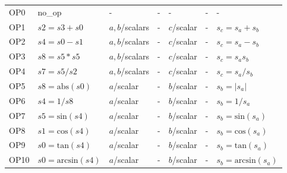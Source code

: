 \documentclass[11pt,oneside,openany,report]{jsbook}
\begin{document}
\begin{center}
{{\begin{longtable}{l|l|lc|lc|l}
        \label{table:instructions}
        OP0  & no\_op                                     & -                       & -               & -          & -     & -                                                                              \\
        OP1  & $s2 = s3 + s0$                             & $a,b$/scalars           & -               & $c$/scalar & -     & $s_c = s_a + s_b$                                                              \\
        OP2  & $s4 = s0 - s1$                             & $a,b$/scalars           & -               & $c$/scalar & -     & $s_c = s_a - s_b$                                                              \\
        OP3  & $s8 = s5 * s5$                             & $a,b$/scalars           & -               & $c$/scalar & -     & $s_c = s_a s_b$                                                                \\
        OP4  & $s7 = s5 / s2$                             & $a,b$/scalars           & -               & $c$/scalar & -     & $s_c = s_a / s_b$                                                              \\
        OP5  & $s8 = \mathrm{abs}(s0)$                    & $a$/scalar              & -               & $b$/scalar & -     & $s_b = |s_a|$                                                                  \\
        OP6  & $s4 = 1/ s8$                               & $a$/scalar              & -               & $b$/scalar & -     & $s_b = 1/s_a$                                                                  \\
        OP7  & $s5 = \mathrm{sin}(s4)$                    & $a$/scalar              & -               & $b$/scalar & -     & $s_b = \mathrm{sin}(s_a)$                                                      \\
        OP8  & $s1 = \mathrm{cos}(s4)$                    & $a$/scalar              & -               & $b$/scalar & -     & $s_b = \mathrm{cos}(s_a)$                                                      \\
        OP9  & $s0 = \mathrm{tan}(s4)$                    & $a$/scalar              & -               & $b$/scalar & -     & $s_b = \mathrm{tan}(s_a)$                                                      \\
        OP10 & $s0 = \mathrm{arcsin}(s4)$                 & $a$/scalar              & -               & $b$/scalar & -     & $s_b = \mathrm{arcsin}(s_a)$                                                   \\

\end{longtable}}}
\end{center}
\end{document}
